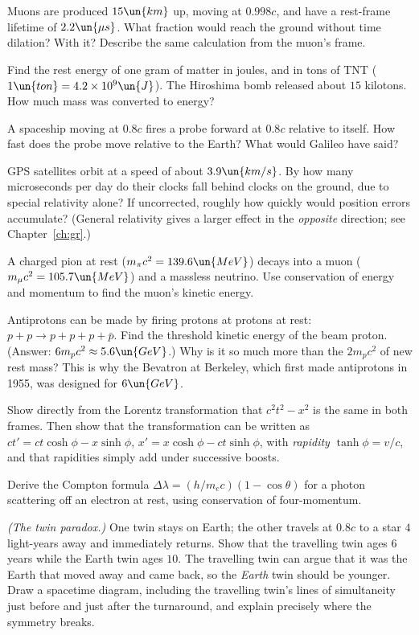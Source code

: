 \begin{problems}
\core Muons are produced $15\un{km}$ up, moving at $0.998c$, and have a rest-frame lifetime of $2.2\un{\mu s}$. What fraction would reach the ground without time dilation? With it? Describe the same calculation from the muon's frame.

 Find the rest energy of one gram of matter in joules, and in tons of TNT ($1\un{ton} = 4.2\times10^{9}\un{J}$). The Hiroshima bomb released about $15$ kilotons. How much mass was converted to energy?

 A spaceship moving at $0.8c$ fires a probe forward at $0.8c$ relative to itself. How fast does the probe move relative to the Earth? What would Galileo have said?

\core \label{prob:gps-sr} GPS satellites orbit at a speed of about $3.9\un{km/s}$. By how many microseconds per day do their clocks fall behind clocks on the ground, due to special relativity alone? If uncorrected, roughly how quickly would position errors accumulate? (General relativity gives a larger effect in the \emph{opposite} direction; see Chapter~\ref{ch:gr}.)

 A charged pion at rest ($m_\pi c^2 = 139.6\un{MeV}$) decays into a muon ($m_\mu c^2 = 105.7\un{MeV}$) and a massless neutrino. Use conservation of energy and momentum to find the muon's kinetic energy.

\core Antiprotons can be made by firing protons at protons at rest: $p + p\to p + p + p + \bar p$. Find the threshold kinetic energy of the beam proton. (Answer: $6m_pc^2\approx5.6\un{GeV}$.) Why is it so much more than the $2m_pc^2$ of new rest mass? This is why the Bevatron at Berkeley, which first made antiprotons in 1955, was designed for $6\un{GeV}$.

 Show directly from the Lorentz transformation that $c^2t^2 - x^2$ is the same in both frames. Then show that the transformation can be written as $ct' = ct\cosh\phi - x\sinh\phi$, $x' = x\cosh\phi - ct\sinh\phi$, with \emph{rapidity} $\tanh\phi = v/c$, and that rapidities simply add under successive boosts.

 Derive the Compton formula $\Delta\lambda = (h/m_ec)(1-\cos\theta)$ for a photon scattering off an electron at rest, using conservation of four-momentum.

\core \label{prob:twins} \emph{(The twin paradox.)} One twin stays on Earth; the other travels at $0.8c$ to a star $4$ light-years away and immediately returns. Show that the travelling twin ages $6$ years while the Earth twin ages $10$. The travelling twin can argue that it was the Earth that moved away and came back, so the \emph{Earth} twin should be younger. Draw a spacetime diagram, including the travelling twin's lines of simultaneity just before and just after the turnaround, and explain precisely where the symmetry breaks.


\end{problems}
